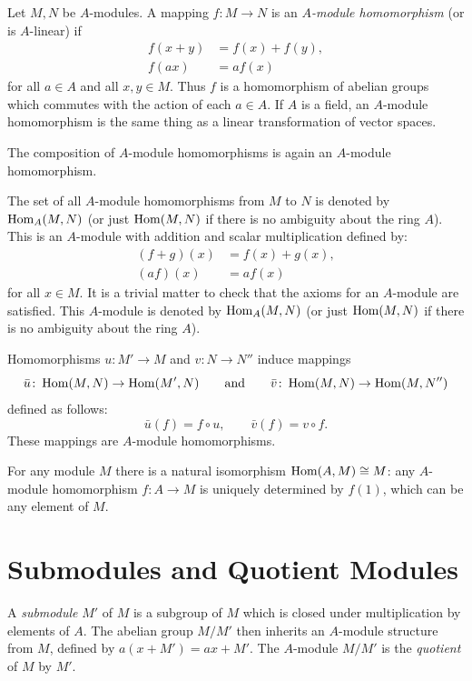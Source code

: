 Let $M, N$ be $A$-modules. A mapping $f \colon M \to N$ is an \emph{$A$-module homomorphism} (or is $A$-linear) if
\begin{align*}
    f(x + y) &= f(x) + f(y), \\
    f(ax) &= af(x)
\end{align*}
for all $a \in A$ and all $x, y \in M$. Thus $f$ is a homomorphism of abelian groups which commutes with the action of each $a\in A$. If $A$ is a field, an $A$-module homomorphism is the same thing as a linear transformation of vector spaces.

The composition of $A$-module homomorphisms is again an $A$-module homomorphism.

The set of all $A$-module homomorphisms from $M$ to $N$ is denoted by $\operatorname{Hom}_A(M, N)$ (or just $\operatorname{Hom}(M, N)$ if there is no ambiguity about the ring $A$). This is an $A$-module with addition and scalar multiplication defined by:
\begin{align*}
    (f + g)(x) &= f(x) + g(x), \\
    (af)(x) &= af(x)
\end{align*}
for all $x \in M$. It is a trivial matter to check that the axioms for an $A$-module are satisfied. This $A$-module is denoted by $\operatorname{Hom}_A(M,N)$ (or just $\operatorname{Hom}(M,N)$ if there is no ambiguity about the ring $A$).

Homomorphisms $u \colon M' \to M$ and $v \colon N \to N''$ induce mappings
\[
    \bar{u} \colon \operatorname{Hom}(M, N) \to \operatorname{Hom}(M', N) \qquad \text{and} \qquad \bar{v} \colon \operatorname{Hom}(M, N) \to \operatorname{Hom}(M, N'')
\]
defined as follows:
\[
    \bar{u}(f) = f \circ u, \qquad \bar{v}(f) = v \circ f.
\]
These mappings are $A$-module homomorphisms.

For any module $M$ there is a natural isomorphism $\operatorname{Hom}(A, M) \cong M$: any $A$-module homomorphism $f \colon A \to M$ is uniquely determined by $f(1)$, which can be any element of $M$.

\section*{Submodules and Quotient Modules}

A \emph{submodule} $M'$ of $M$ is a subgroup of $M$ which is closed under multiplication by elements of $A$. The abelian group $M/M'$ then inherits an $A$-module structure from $M$, defined by $a(x + M') = ax + M'$. The $A$-module $M/M'$ is the \emph{quotient} of $M$ by $M'$.

